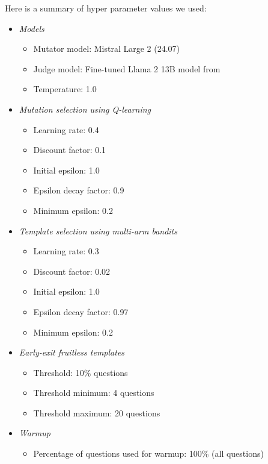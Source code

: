 Here is a summary of hyper parameter values we used:
\begin{itemize}[leftmargin=*,noitemsep, topsep=0pt]
    \item \textit{Models}
    \begin{itemize}
        \item Mutator model: Mistral Large 2 (24.07)
        \item Judge model: Fine-tuned Llama 2 13B model from~\cite{mazeika2024harmbench}
        \item Temperature: 1.0        
    \end{itemize}
    \item \textit{Mutation selection using Q-learning}
    \begin{itemize}
        \item Learning rate: 0.4
        \item Discount factor: 0.1
        \item Initial epsilon: 1.0
        \item Epsilon decay factor: 0.9
        \item Minimum epsilon: 0.2
    \end{itemize}
    \item \textit{Template selection using multi-arm bandits}
    \begin{itemize}
        \item Learning rate: 0.3
        \item Discount factor: 0.02
        \item Initial epsilon: 1.0
        \item Epsilon decay factor: 0.97
        \item Minimum epsilon: 0.2
    \end{itemize}
    \item \textit{Early-exit fruitless templates}
    \begin{itemize}
        \item Threshold: 10\% questions
        \item Threshold minimum: 4 questions
        \item Threshold maximum: 20 questions
    \end{itemize}
    \item \textit{Warmup}
    \begin{itemize}
        \item Percentage of questions used for warmup: 100\% (all questions)
    \end{itemize}
\end{itemize}



